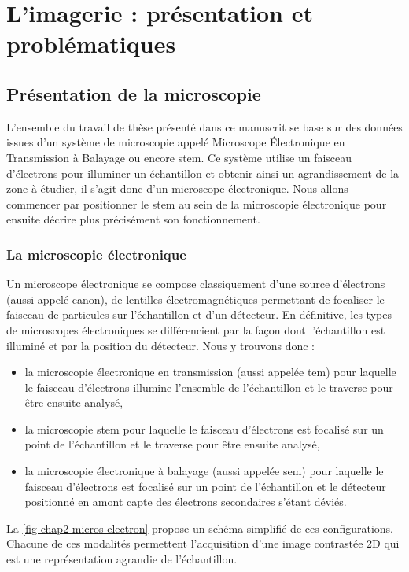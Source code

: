 
\chapter{L'imagerie  : présentation et problématiques}
\label{ch-chapter_1}

    \dochaptoc
    \graphicspath{{img/chapitre2/}}

    \section{Présentation de la microscopie }

    L'ensemble du travail de thèse présenté dans ce manuscrit se base sur des données issues d'un système de microscopie appelé Microscope \'Electronique en Transmission à Balayage ou encore \acf{stem}. Ce système utilise un faisceau d'électrons pour illuminer un échantillon et obtenir ainsi un agrandissement de la zone à étudier, il s'agit donc d'un microscope électronique. Nous allons commencer par positionner le \gls{stem} au sein de la microscopie électronique pour ensuite décrire plus précisément son fonctionnement.

    \subsection{La microscopie électronique}

    Un microscope électronique se compose classiquement d'une source d'électrons (aussi appelé canon), de lentilles électromagnétiques permettant de focaliser le faisceau de particules sur l'échantillon et d'un détecteur. En définitive, les types de microscopes électroniques se différencient par la façon dont l'échantillon est illuminé et par la position du détecteur. Nous y trouvons donc :
    \begin{itemize}
    	\item la microscopie électronique en transmission (aussi appelée \gls{tem}) pour laquelle le faisceau d'électrons illumine l'ensemble de l'échantillon et le traverse pour être ensuite analysé,
    	\item la microscopie \gls{stem} pour laquelle le faisceau d'électrons est focalisé sur un point de l'échantillon et le traverse pour être ensuite analysé,
    	\item la microscopie électronique à balayage (aussi appelée \gls{sem}) pour laquelle le faisceau d'électrons est focalisé sur un point de l'échantillon et le détecteur positionné en amont capte des électrons secondaires s'étant déviés.
    \end{itemize}
    La \cref{fig-chap2-micros-electron} propose un schéma simplifié de ces configurations. Chacune de ces modalités permettent l'acquisition d'une image contrastée 2D qui est une représentation agrandie de l'échantillon.

